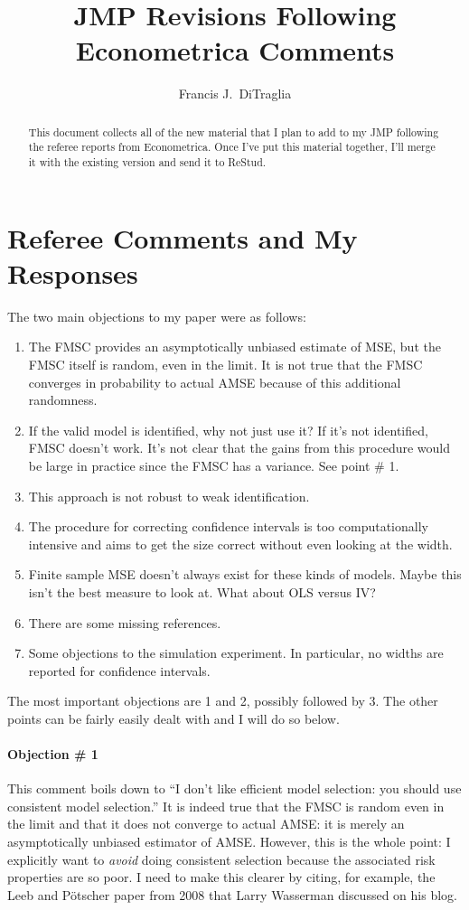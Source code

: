 \documentclass[12pt]{article}\usepackage[]{graphicx}\usepackage[]{color}
\title{JMP Revisions Following Econometrica Comments}
\author{Francis J.\ DiTraglia}
\theoremstyle{definition}
\begin{document}
\maketitle

\begin{abstract}
This document collects all of the new material that I plan to add to my JMP following the referee reports from Econometrica. Once I've put this material together, I'll merge it with the existing version and send it to ReStud.
\end{abstract}

\section*{Referee Comments and My Responses}
The two main objections to my paper were as follows:
  \begin{enumerate}
    \item The FMSC provides an asymptotically unbiased estimate of MSE, but the FMSC itself is random, even in the limit. It is not true that the FMSC converges in probability to actual AMSE because of this additional randomness. 
    \item If the valid model is identified, why not just use it? If it's not identified, FMSC doesn't work. It's not clear that the gains from this procedure would be large in practice since the FMSC has a variance. See point \# 1. 
    \item This approach is not robust to weak identification.
    \item The procedure for correcting confidence intervals is too computationally intensive and aims to get the size correct without even looking at the width.
    \item Finite sample MSE doesn't always exist for these kinds of models. Maybe this isn't the best measure to look at.
    What about OLS versus IV?
    \item There are some missing references.
    \item Some objections to the simulation experiment. In particular, no widths are reported for confidence intervals.
  \end{enumerate}
The most important objections are 1 and 2, possibly followed by 3. The other points can be fairly easily dealt with and I will do so below. 

\paragraph{Objection \# 1} This comment boils down to ``I don't like efficient model selection: you should use consistent model selection.'' It is indeed true that the FMSC is random even in the limit and that it does not converge to actual AMSE: it is merely an asymptotically unbiased estimator of AMSE. However, this is the whole point: I explicitly want to \emph{avoid} doing consistent selection because the associated risk properties are so poor. I need to make this clearer by citing, for example, the Leeb and P\"{o}tscher paper from 2008 that Larry Wasserman discussed on his blog.
\end{document}
